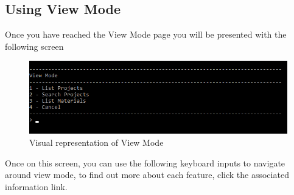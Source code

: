 \documentclass[
  english,
  a4paper,
,tablecaptionabove
]{scrartcl}
\begin{document}
\newpage

\hypertarget{using-view-mode}{%
\subsection{Using View Mode}\label{using-view-mode}}

Once you have reached the View Mode page you will be presented with the
following screen

\begin{figure}
\centering
\includegraphics{images/user-guide/view-mode/using-view-mode.png}
\caption{Visual representation of View Mode}
\end{figure}

Once on this screen, you can use the following keyboard inputs to
navigate around view mode, to find out more about each feature, click
the associated information link.
\end{document}
